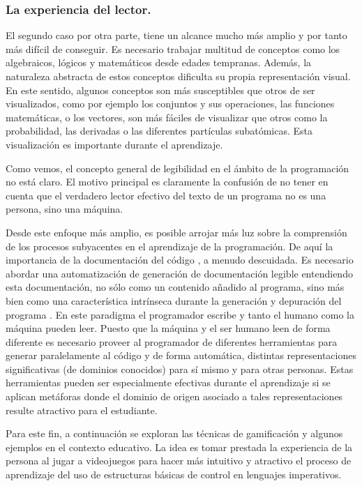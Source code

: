 \documentclass{llncs}
\begin{document}
\subsubsection{La experiencia del lector.}
\label{subsec:reader}

El segundo caso por otra parte, tiene un alcance mucho más amplio y por tanto más difícil de conseguir. Es necesario trabajar multitud de conceptos como los algebraicos, lógicos y matemáticos desde edades tempranas. Además, la naturaleza abstracta de estos conceptos dificulta su propia representación visual. En este sentido, algunos conceptos son más susceptibles que otros de ser visualizados, como por ejemplo los conjuntos y sus operaciones, las funciones matemáticas, o los vectores, son más fáciles de visualizar que otros como la probabilidad, las derivadas o las diferentes partículas subatómicas. Esta visualización es importante durante el aprendizaje.

Como vemos, el concepto general de legibilidad en el ámbito de la programación no está claro. El motivo principal es claramente la confusión de no tener en cuenta que el verdadero lector efectivo del texto de un programa no es una persona, sino una máquina. 

Desde este enfoque más amplio, es posible arrojar más luz sobre la comprensión de los procesos subyacentes en el aprendizaje de la programación. De aquí la importancia de la documentación del código \cite{tenny1988program}, a menudo descuidada. Es necesario abordar una automatización de generación de documentación legible entendiendo esta documentación, no sólo como un contenido añadido al programa, sino más bien como una característica intrínseca durante la generación y depuración del programa \cite{baecker1988enhancing}. En este paradigma el programador escribe y tanto el humano como la máquina pueden leer. Puesto que la máquina y el ser humano leen de forma diferente es necesario proveer al programador de diferentes herramientas para generar paralelamente al código y de forma automática, distintas representaciones significativas (de dominios conocidos) para sí mismo y para otras personas. Estas herramientas pueden ser especialmente efectivas durante el aprendizaje si se aplican metáforas donde el dominio de origen asociado a tales representaciones resulte atractivo para el estudiante.

Para este fin, a continuación se exploran las técnicas de gamificación y algunos ejemplos en el contexto educativo. La idea es tomar prestada la experiencia de la persona al jugar a videojuegos para hacer más intuitivo y atractivo el proceso de aprendizaje del uso de estructuras básicas de control en lenguajes imperativos. 
\end{document}
